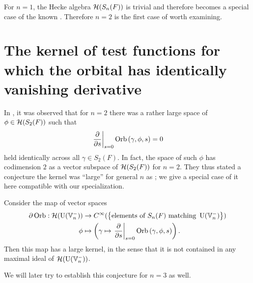 \begin{remark}
  For $n = 1$, the Hecke algebra $\mathcal H(S_n(F))$ is trivial
  and therefore 
  becomes a special case of the known \cite{ref:liuFJ}.
  Therefore $n=2$ is the first case of  worth examining.
\end{remark}

\section{The kernel of test functions for which the orbital has identically vanishing derivative}
\label{sec:intro_large_kernel}

In \cite{ref:AFLspherical}, it was observed that for $n = 2$
there was a rather large space of $\phi \in \mathcal H(S_2(F))$ such that
\[ \left. \pdv{}{s} \right\rvert_{s=0}
  \operatorname{Orb} \left(\gamma, \phi, s \right) = 0 \]
held identically across all $\gamma \in S_2(F)$.
In fact, the space of such $\phi$ has codimension $2$
as a vector subspace of $\mathcal H(S_2(F))$ for $n = 2$.
They thus stated a conjecture the kernel was ``large'' for general $n$
as \cite[Conjecture 1.0.2]{ref:AFLspherical};
we give a special case of it here compatible with our specialization.
\begin{conjecture}
  \label{conj:large_kernel_group}
  Consider the map of vector spaces
  \begin{align*}
    \partial\operatorname{Orb} : \mathcal H(\operatorname{U}(\mathbb V_n^-))
    &\to C^\infty( \left\{ \text{elements of } S_n(F) \text{ matching } \operatorname{U}(\mathbb V_n^-) \right\} ) \\
    \phi &\mapsto \left( \gamma \mapsto \left. \pdv{}{s} \right\rvert_{s=0} \operatorname{Orb} \left(\gamma, \phi, s \right) \right).
  \end{align*}
  Then this map has a large kernel,
  in the sense that it is not contained in any maximal ideal of $\mathcal H(\operatorname{U}(\mathbb V_n^-))$.
\end{conjecture}
We will later try to establish this conjecture for $n = 3$ as well.

